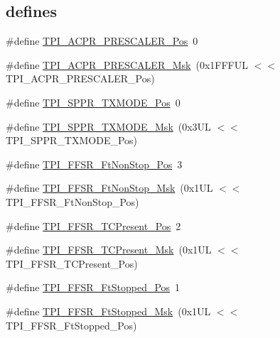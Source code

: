 \subsection*{\textquotesingle{}defines\textquotesingle{}}
\begin{DoxyCompactItemize}
\item 
\#define \hyperlink{group___c_m_s_i_s___t_p_i_ga5a82d274eb2df8b0c92dd4ed63535928}{T\+P\+I\+\_\+\+A\+C\+P\+R\+\_\+\+P\+R\+E\+S\+C\+A\+L\+E\+R\+\_\+\+Pos}~0
\item 
\#define \hyperlink{group___c_m_s_i_s___t_p_i_ga4fcacd27208419929921aec8457a8c13}{T\+P\+I\+\_\+\+A\+C\+P\+R\+\_\+\+P\+R\+E\+S\+C\+A\+L\+E\+R\+\_\+\+Msk}~(0x1\+F\+F\+F\+U\+L $<$$<$ T\+P\+I\+\_\+\+A\+C\+P\+R\+\_\+\+P\+R\+E\+S\+C\+A\+L\+E\+R\+\_\+\+Pos)
\item 
\#define \hyperlink{group___c_m_s_i_s___t_p_i_ga0f302797b94bb2da24052082ab630858}{T\+P\+I\+\_\+\+S\+P\+P\+R\+\_\+\+T\+X\+M\+O\+D\+E\+\_\+\+Pos}~0
\item 
\#define \hyperlink{group___c_m_s_i_s___t_p_i_gaca085c8a954393d70dbd7240bb02cc1f}{T\+P\+I\+\_\+\+S\+P\+P\+R\+\_\+\+T\+X\+M\+O\+D\+E\+\_\+\+Msk}~(0x3\+U\+L $<$$<$ T\+P\+I\+\_\+\+S\+P\+P\+R\+\_\+\+T\+X\+M\+O\+D\+E\+\_\+\+Pos)
\item 
\#define \hyperlink{group___c_m_s_i_s___t_p_i_ga9537b8a660cc8803f57cbbee320b2fc8}{T\+P\+I\+\_\+\+F\+F\+S\+R\+\_\+\+Ft\+Non\+Stop\+\_\+\+Pos}~3
\item 
\#define \hyperlink{group___c_m_s_i_s___t_p_i_gaaa313f980974a8cfc7dac68c4d805ab1}{T\+P\+I\+\_\+\+F\+F\+S\+R\+\_\+\+Ft\+Non\+Stop\+\_\+\+Msk}~(0x1\+U\+L $<$$<$ T\+P\+I\+\_\+\+F\+F\+S\+R\+\_\+\+Ft\+Non\+Stop\+\_\+\+Pos)
\item 
\#define \hyperlink{group___c_m_s_i_s___t_p_i_gad30fde0c058da2ffb2b0a213be7a1b5c}{T\+P\+I\+\_\+\+F\+F\+S\+R\+\_\+\+T\+C\+Present\+\_\+\+Pos}~2
\item 
\#define \hyperlink{group___c_m_s_i_s___t_p_i_ga0d6bfd263ff2fdec72d6ec9415fb1135}{T\+P\+I\+\_\+\+F\+F\+S\+R\+\_\+\+T\+C\+Present\+\_\+\+Msk}~(0x1\+U\+L $<$$<$ T\+P\+I\+\_\+\+F\+F\+S\+R\+\_\+\+T\+C\+Present\+\_\+\+Pos)
\item 
\#define \hyperlink{group___c_m_s_i_s___t_p_i_gaedf31fd453a878021b542b644e2869d2}{T\+P\+I\+\_\+\+F\+F\+S\+R\+\_\+\+Ft\+Stopped\+\_\+\+Pos}~1
\item 
\#define \hyperlink{group___c_m_s_i_s___t_p_i_ga1ab6c3abe1cf6311ee07e7c479ce5f78}{T\+P\+I\+\_\+\+F\+F\+S\+R\+\_\+\+Ft\+Stopped\+\_\+\+Msk}~(0x1\+U\+L $<$$<$ T\+P\+I\+\_\+\+F\+F\+S\+R\+\_\+\+Ft\+Stopped\+\_\+\+Pos)
$$
\end{DoxyCompactItemize}
